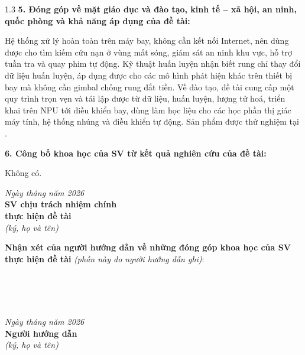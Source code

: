 \begin{spacing}{1.3}
\noindent\textbf{5. Đóng góp về mặt giáo dục và đào tạo, kinh tế -- xã hội, an ninh, quốc phòng và khả năng áp dụng của đề tài:}

Hệ thống xử lý hoàn toàn trên máy bay, không cần kết nối Internet, nên dùng được cho tìm kiếm cứu nạn ở vùng mất sóng, giám sát an ninh khu vực, hỗ trợ tuần tra và quay phim tự động. Kỹ thuật huấn luyện nhận biết rung chỉ thay đổi dữ liệu huấn luyện, áp dụng được cho các mô hình phát hiện khác trên thiết bị bay mà không cần gimbal chống rung đắt tiền. Về đào tạo, đề tài cung cấp một quy trình trọn vẹn và tái lập được từ dữ liệu, huấn luyện, lượng tử hoá, triển khai trên NPU tới điều khiển bay, dùng làm học liệu cho các học phần thị giác máy tính, hệ thống nhúng và điều khiển tự động. Sản phẩm được thử nghiệm tại \truong.

\noindent\textbf{6. Công bố khoa học của SV từ kết quả nghiên cứu của đề tài:}

Không có.
\end{spacing}

\vspace{6pt}
\noindent\begin{minipage}[t]{0.45\textwidth}\end{minipage}\hfill
\begin{minipage}[t]{0.48\textwidth}\centering{}
\textit{Ngày \makebox[0.8cm]{\dotfill} tháng \makebox[0.8cm]{\dotfill} năm 2026}\\
\textbf{SV chịu trách nhiệm chính}\\\textbf{thực hiện đề tài}\\
\textit{(ký, họ và tên)}\\[1.6cm]
\chunhiem
\end{minipage}

\vspace{10pt}
\noindent\textbf{Nhận xét của người hướng dẫn về những đóng góp khoa học của SV thực hiện đề tài} \textit{(phần này do người hướng dẫn ghi)}:

\noindent\makebox[\textwidth]{\dotfill}\\
\makebox[\textwidth]{\dotfill}\\
\makebox[\textwidth]{\dotfill}\\
\makebox[\textwidth]{\dotfill}

\vspace{4pt}
\noindent\begin{minipage}[t]{0.45\textwidth}\end{minipage}\hfill
\begin{minipage}[t]{0.48\textwidth}\centering{}
\textit{Ngày \makebox[0.8cm]{\dotfill} tháng \makebox[0.8cm]{\dotfill} năm 2026}\\
\textbf{Người hướng dẫn}\\
\textit{(ký, họ và tên)}\\[1.6cm]
\gvhd
\end{minipage}
\clearpage
